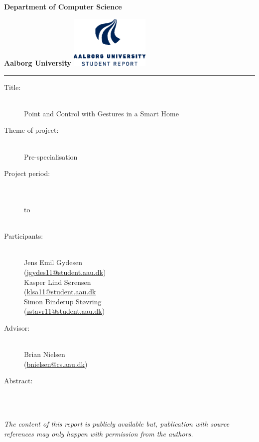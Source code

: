 {\setlength{\parindent}{0pt}
\begin{nopagebreak}
  \begin{minipage}{\textwidth}
    \vspace{2cm}
    \LARGE{\textbf{Department of Computer Science}}\vspace{-2.1cm}

    \large{\textbf{Aalborg University}}
    \hspace{8cm}\includegraphics[height=2.5cm]{images/aau_logo_en_blue.eps}
  \end{minipage}
  \vspace{0.1cm}
  \hrule

  \newcommand{\titleitem}[2]{\item[#1:] ~\\ #2 \\}
  \begin{multicols}{2}
  	\begin{description}
  		\titleitem{Title}{Point and Control with Gestures in a Smart Home}
  		\titleitem{Theme of project}{Pre-specialisation}
  		\titleitem{Project period}{\protect{}\\ to\\ \protect\formatdate{21}{12}{2015}}
  		\titleitem{Participants}{
  			Jens Emil Gydesen \\ (\url{jgydes11@student.aau.dk})\\ 
  			Kasper Lind Sørensen \\(\url{klsa11@student.aau.dk}\\
  			Simon Binderup Støvring \\(\url{sstavr11@student.aau.dk})
  			}
  		\titleitem{Advisor}{Brian Nielsen\\(\url{bnielsen@cs.aau.dk})}
  	\end{description}
    \vfill
    \columnbreak

    \begin{description}
    	\titleitem{Abstract}{}
    \end{description}

  \end{multicols}
  \vfill

  \begin{center}
    \textit{The content of this report is publicly available but,
    publication with source references may only happen with permission from
    the authors.}
  \end{center}
\end{nopagebreak}
}